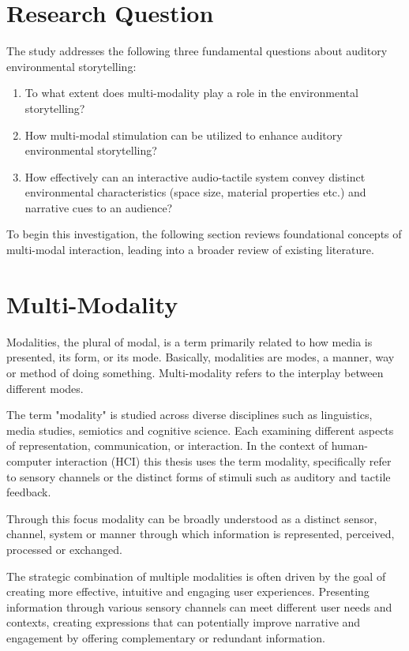     \section{Research Question} 
        The study addresses the following three fundamental questions about auditory environmental storytelling:
        \begin{enumerate}
            \item To what extent does multi-modality play a role in the environmental storytelling?
            \item How multi-modal stimulation can be utilized to enhance auditory environmental storytelling?
            \item How effectively can an interactive audio-tactile system convey distinct environmental characteristics (space size, material properties etc.) and narrative cues to an audience?
        \end{enumerate}
        To begin this investigation, the following section reviews foundational concepts of multi-modal interaction, leading into a broader review of existing literature.
        \section{Multi-Modality} 
        Modalities, the plural of modal, is a term primarily related to how media is presented, its form, or its mode. Basically, modalities are modes, a manner, way or method of doing something. Multi-modality refers to the interplay between different modes\cite{Multimodal_Discourse}.\par 

        The term "modality" is studied across diverse disciplines such as linguistics, media studies, semiotics and cognitive science. Each examining different aspects of representation, communication, or interaction. In the context of human-computer interaction (HCI) this thesis uses the term modality, specifically refer to sensory channels or the distinct forms of stimuli such as auditory and tactile feedback.\par

        Through this focus modality can be broadly understood as a distinct sensor, channel, system or manner through which information is represented, perceived, processed or exchanged.\par

        The strategic combination of multiple modalities is often driven by the goal of creating more effective, intuitive and engaging user experiences. Presenting information through various sensory channels can meet different user needs and contexts, creating expressions that can potentially improve narrative and engagement by offering complementary or redundant information.\par

